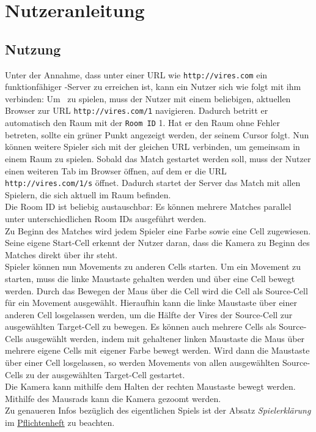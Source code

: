\section{Nutzeranleitung}
\subsection{Nutzung}
Unter der Annahme, dass unter einer URL wie \verb+http://vires.com+ ein funktionfähiger \vires-Server zu erreichen ist, kann ein Nutzer sich wie folgt mit ihm verbinden:
Um \vires\ zu spielen, muss der Nutzer mit einem beliebigen, aktuellen Browser zur URL \verb+http://vires.com/1+ navigieren. Dadurch betritt er automatisch den Raum mit der \verb+Room ID+ 1. Hat er den Raum ohne Fehler betreten, sollte ein grüner Punkt angezeigt werden, der seinem Cursor folgt. Nun können weitere Spieler sich mit der gleichen URL verbinden, um gemeinsam in einem Raum zu spielen. Sobald das Match gestartet werden soll, muss der Nutzer einen weiteren Tab im Browser öffnen, auf dem er die URL \verb+http://vires.com/1/s+ öffnet. Dadurch startet der Server das Match mit allen Spielern, die sich aktuell im Raum befinden. \\
Die Room ID ist beliebig austauschbar: Es können mehrere Matches parallel unter unterschiedlichen Room IDs ausgeführt werden. \\
Zu Beginn des Matches wird jedem Spieler eine Farbe sowie eine Cell zugewiesen. Seine eigene Start-Cell erkennt der Nutzer daran, dass die Kamera zu Beginn des Matches direkt über ihr steht. \\
Spieler können nun Movements zu anderen Cells starten. Um ein Movement zu starten, muss die linke Maustaste gehalten werden und über eine Cell bewegt werden. Durch das Bewegen der Maus über die Cell wird die Cell als Source-Cell für ein Movement ausgewählt. Hieraufhin kann die linke Maustaste über einer anderen Cell losgelassen werden, um die Hälfte der Vires der Source-Cell zur ausgewählten Target-Cell zu bewegen. Es können auch mehrere Cells als Source-Cells ausgewählt werden, indem mit gehaltener linken Maustaste die Maus über mehrere eigene Cells mit eigener Farbe bewegt werden. Wird dann die Maustaste über einer Cell losgelassen, so werden Movements von allen ausgewählten Source-Cells zu der ausgewählten Target-Cell gestartet. \\
Die Kamera kann mithilfe dem Halten der rechten Maustaste bewegt werden. Mithilfe des Mausrads kann die Kamera gezoomt werden. \\
Zu genaueren Infos bezüglich des eigentlichen Spiels ist der Absatz \textit{Spielerklärung} im \href{https://github.com/mhuisi/vires/blob/master/doc/fsd/vires.pdf}{Pflichtenheft} zu beachten.

